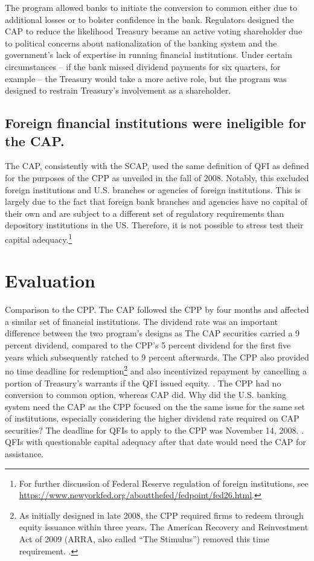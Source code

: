 \documentclass[12pt]{article}
\begin{document}
The program allowed banks to initiate the conversion to common either due to additional losses or to bolster confidence in the bank. Regulators designed the CAP to reduce the likelihood Treasury became an active voting shareholder due to political concerns about nationalization of the banking system and the government's lack of expertise in running financial institutions. Under certain circumstances -- if the bank missed dividend payments for six quarters, for example -- the Treasury would take a more active role, but the program was designed to restrain Treasury's involvement as a shareholder.

\subsection{Foreign financial institutions were ineligible for the CAP.}

The CAP, consistently with the SCAP, used the same definition of QFI as defined for the purposes of the CPP as unveiled in the fall of 2008. Notably, this excluded foreign institutions and U.S. branches or agencies of foreign institutions. This is largely due to the fact that foreign bank branches and agencies have no capital of their own and are subject to a different set of regulatory requirements than depository institutions in the US. Therefore, it is not possible to stress test their capital adequacy.\footnote{For further discussion of Federal Reserve regulation of foreign institutions, see \url{https://www.newyorkfed.org/aboutthefed/fedpoint/fed26.html}.}

\section{Evaluation}

Comparison to the CPP. The CAP followed the CPP by four months and affected a similar set of financial institutions. The dividend rate was an important difference between the two program's designs as The CAP securities carried a 9 percent dividend, compared to the CPP's 5 percent dividend for the first five years which subsequently ratched to 9 percent afterwards. The CPP also provided no time deadline for redemption\footnote{As initially designed in late 2008, the CPP required firms to redeem through equity issuance within three years. The American Recovery and Reinvestment Act of 2009 (ARRA, also called “The Stimulus”) removed this time requirement. \citep{GW}.} and also incentivized repayment by cancelling a portion of Treasury's warrants if the QFI issued equity. \citep{GW}. The CPP had no conversion to common option, whereas CAP did. Why did the U.S. banking system need the CAP as the CPP focused on the the same issue for the same set of institutions, especially considering the higher dividend rate required on CAP securities? The deadline for QFIs to apply to the CPP was November 14, 2008. \citep{CPPFaq}. QFIs with questionable capital adequacy after that date would need the CAP for assistance.
\end{document}
